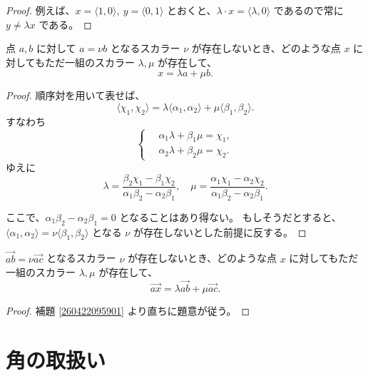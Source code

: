 \begin{proof}
  例えば、\(x=\langle1,0\rangle,\ y=\langle0,1\rangle\) とおくと、\(\lambda\cdot x=\langle\lambda,0\rangle\) であるので常に \(y\neq\lambda x\) である。
\end{proof}


\begin{lmm}\label{260422095901}
  点 \(a,b\) に対して \(a=\nu b\) となるスカラー \(\nu\) が存在しないとき、どのような点 \(x\) に対してもただ一組のスカラー \(\lambda,\mu\) が存在して、
  \[x=\lambda a+\mu b.\]
\end{lmm}

\begin{proof}
  順序対を用いて表せば、
  \[\langle\chi_1,\chi_2\rangle=\lambda\langle\alpha_1,\alpha_2\rangle+\mu\langle\beta_1,\beta_2\rangle.\]
  すなわち
  \[
    \left\{\,
      \begin{aligned}
        & \alpha_1\lambda+\beta_1\mu=\chi_1, \\
        & \alpha_2\lambda+\beta_2\mu=\chi_2.
      \end{aligned}
    \right.
  \]
  ゆえに
  \[
    \lambda=\frac{\beta_2\chi_1-\beta_1\chi_2}{\alpha_1\beta_2-\alpha_2\beta_1},\quad
    \mu=\frac{\alpha_1\chi_1-\alpha_2\chi_2}{\alpha_1\beta_2-\alpha_2\beta_1}.
  \]

  ここで、\(\alpha_1\beta_2-\alpha_2\beta_1=0\) となることはあり得ない。
  もしそうだとすると、\(\langle\alpha_1,\alpha_2\rangle=\nu\langle\beta_1,\beta_2\rangle\) となる \(\nu\) が存在しないとした前提に反する。
\end{proof}


\begin{thm}\label{260424194701}
  \(\overrightarrow{ab}=\nu\overrightarrow{ac}\) となるスカラー \(\nu\) が存在しないとき、どのような点 \(x\) に対してもただ一組のスカラー \(\lambda,\mu\) が存在して、
  \[\overrightarrow{ax}=\lambda\overrightarrow{ab}+\mu\overrightarrow{ac}.\]
\end{thm}

\begin{proof}
  補題 \ref{260422095901} より直ちに題意が従う。
\end{proof}


\section{角の取扱い}


